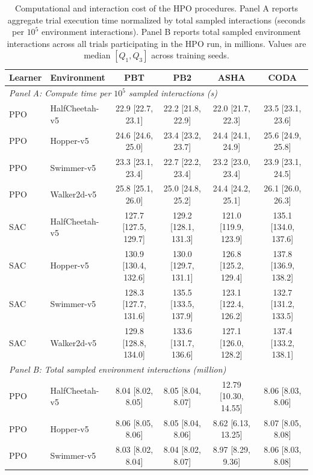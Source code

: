 \begin{table}[!t]
\centering
\caption{Computational and interaction cost of the HPO procedures. Panel A reports aggregate trial execution time normalized by total sampled interactions (seconds per $10^5$ environment interactions). Panel B reports total sampled environment interactions across all trials participating in the HPO run, in millions. Values are median $[Q_1,Q_3]$ across training seeds.}
\label{tab:computational-cost}
\footnotesize
\setlength{\tabcolsep}{5.2pt}
\renewcommand{\arraystretch}{1.10}
\begin{tabular}{@{}llcccc@{}}
\toprule
\textbf{Learner} & \textbf{Environment} & \textbf{PBT} & \textbf{PB2} & \textbf{ASHA} & \textbf{CODA} \\
\midrule
\multicolumn{6}{l}{\textit{Panel A: Compute time per $10^5$ sampled interactions (s)}} \\[1pt]
PPO & HalfCheetah-v5 & 22.9 [22.7, 23.1] & 22.2 [21.8, 22.9] & 22.0 [21.7, 22.3] & 23.5 [23.1, 23.6] \\
PPO & Hopper-v5 & 24.6 [24.6, 25.0] & 23.4 [23.2, 23.7] & 24.4 [24.1, 24.9] & 25.6 [24.9, 25.8] \\
PPO & Swimmer-v5 & 23.3 [23.1, 23.4] & 22.7 [22.2, 23.4] & 23.2 [23.0, 23.4] & 23.9 [23.1, 24.5] \\
PPO & Walker2d-v5 & 25.8 [25.1, 26.0] & 25.0 [24.8, 25.2] & 24.4 [24.2, 25.1] & 26.1 [26.0, 26.3] \\
SAC & HalfCheetah-v5 & 127.7 [127.5, 129.7] & 129.2 [128.1, 131.3] & 121.0 [119.9, 123.9] & 135.1 [134.0, 137.6] \\
SAC & Hopper-v5 & 130.9 [130.4, 132.6] & 130.0 [129.7, 131.1] & 126.8 [125.2, 129.4] & 137.8 [136.9, 138.2] \\
SAC & Swimmer-v5 & 128.3 [127.7, 131.6] & 135.5 [133.5, 137.9] & 123.1 [122.4, 126.2] & 132.7 [131.2, 133.5] \\
SAC & Walker2d-v5 & 129.8 [128.8, 134.0] & 133.6 [131.7, 136.6] & 127.1 [126.0, 128.2] & 137.4 [133.2, 138.1] \\
\midrule
\multicolumn{6}{l}{\textit{Panel B: Total sampled environment interactions (million)}} \\[1pt]
PPO & HalfCheetah-v5 & 8.04 [8.02, 8.05] & 8.05 [8.04, 8.07] & 12.79 [10.30, 14.55] & 8.06 [8.03, 8.06] \\
PPO & Hopper-v5 & 8.06 [8.05, 8.06] & 8.05 [8.04, 8.06] & 8.62 [6.13, 13.25] & 8.07 [8.05, 8.08] \\
PPO & Swimmer-v5 & 8.03 [8.02, 8.04] & 8.04 [8.02, 8.07] & 8.97 [8.29, 9.36] & 8.06 [8.03, 8.08] \\

\end{tabular}
\end{table}
